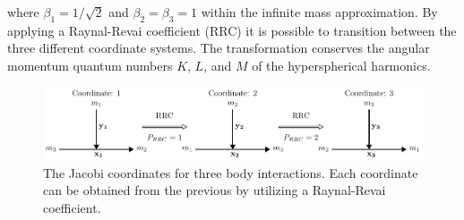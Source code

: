 where $\beta_1=1/\sqrt{2}$ and $\beta_2=\beta_3=1$ within the infinite mass approximation. By applying a Raynal-Revai coefficient (RRC) it is possible to transition between the three different coordinate systems.  The transformation conserves the angular momentum quantum numbers $K$, $L$, and $M$ of the hyperspherical harmonics.

\begin{figure}[!ht]
\centering
\includegraphics[width=\linewidth]{figs/Two_electron/coord_1.pdf}
\caption{The Jacobi coordinates for three body interactions. Each coordinate can be obtained from the previous by utilizing a Raynal-Revai coefficient.} 
  \label{fig:jacobi_coord}
\end{figure}

